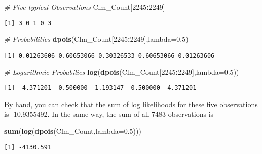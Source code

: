 \documentclass[]{book}
\newenvironment{Shaded}{\begin{snugshade}}{\end{snugshade}}
\newcommand{\KeywordTok}[1]{\textcolor[rgb]{0.13,0.29,0.53}{\textbf{#1}}}
\newcommand{\DataTypeTok}[1]{\textcolor[rgb]{0.13,0.29,0.53}{#1}}
\newcommand{\DecValTok}[1]{\textcolor[rgb]{0.00,0.00,0.81}{#1}}
\newcommand{\FloatTok}[1]{\textcolor[rgb]{0.00,0.00,0.81}{#1}}
\newcommand{\CommentTok}[1]{\textcolor[rgb]{0.56,0.35,0.01}{\textit{#1}}}
\newcommand{\OperatorTok}[1]{\textcolor[rgb]{0.81,0.36,0.00}{\textbf{#1}}}
\newcommand{\NormalTok}[1]{#1}
\theoremstyle{definition}
\theoremstyle{definition}
\theoremstyle{definition}
\theoremstyle{remark}
\begin{document}
\begin{Shaded}
\begin{Highlighting}[]
\CommentTok{#  Five typical Observations}
\NormalTok{Clm_Count[}\DecValTok{2245}\OperatorTok{:}\DecValTok{2249}\NormalTok{]}
\end{Highlighting}
\end{Shaded}

\begin{verbatim}
[1] 3 0 1 0 3
\end{verbatim}

\begin{Shaded}
\begin{Highlighting}[]
\CommentTok{# Probabilities}
\KeywordTok{dpois}\NormalTok{(Clm_Count[}\DecValTok{2245}\OperatorTok{:}\DecValTok{2249}\NormalTok{],}\DataTypeTok{lambda=}\FloatTok{0.5}\NormalTok{)}
\end{Highlighting}
\end{Shaded}

\begin{verbatim}
[1] 0.01263606 0.60653066 0.30326533 0.60653066 0.01263606
\end{verbatim}

\begin{Shaded}
\begin{Highlighting}[]
\CommentTok{# Logarithmic Probabilies}
\KeywordTok{log}\NormalTok{(}\KeywordTok{dpois}\NormalTok{(Clm_Count[}\DecValTok{2245}\OperatorTok{:}\DecValTok{2249}\NormalTok{],}\DataTypeTok{lambda=}\FloatTok{0.5}\NormalTok{))}
\end{Highlighting}
\end{Shaded}

\begin{verbatim}
[1] -4.371201 -0.500000 -1.193147 -0.500000 -4.371201
\end{verbatim}

By hand, you can check that the sum of log likelihoods for these five
observations is -10.9355492. In the same way, the sum of all 7483
observations is

\begin{Shaded}
\begin{Highlighting}[]
\KeywordTok{sum}\NormalTok{(}\KeywordTok{log}\NormalTok{(}\KeywordTok{dpois}\NormalTok{(Clm_Count,}\DataTypeTok{lambda=}\FloatTok{0.5}\NormalTok{)))}
\end{Highlighting}
\end{Shaded}

\begin{verbatim}
[1] -4130.591
\end{verbatim}
\end{document}

